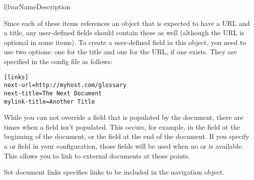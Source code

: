 \begin{tableii}{l|l}{var}{Name}{Description}
\end{tableii}

Since each of these items references an object that is expected to have
a URL and a title, any user-defined fields should contain these as well
(although the URL is optional in some items).  To create a user-defined
field in this object, you need to use two options: one for the title
and one for the URL, if one exists.  They are specified in the config
file as follows:
\begin{verbatim}
[links]
next-url=http://myhost.com/glossary
next-title=The Next Document
mylink-title=Another Title
\end{verbatim}

While you can not override a field that is populated by the document,
there are times when a field isn't populated.  This occurs, for example,
in the  field at the beginning of the document, or the
 field at the end of the document.  If you specify a 
or  field in your configuration, those fields will be used
when no  or  is available.  This allows you to link
to external documents at those points.

\begin{configuration}{Set document links}
specifies links to be included in the navigation object.
\end{configuration}


